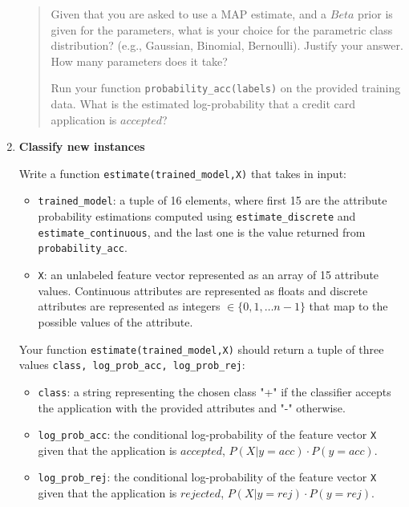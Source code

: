 \begin{enumerate}
    \begin{quote}
     Given that you are asked to use a MAP estimate, and a $Beta$ prior is given for the parameters, what is your choice for the  parametric class distribution? (e.g., Gaussian, Binomial, Bernoulli). Justify your answer. How many parameters does it take?
        
    \begin{tcolorbox}[fit,height=1.5cm, width=10cm, blank, borderline={1pt}{-2pt},nobeforeafter]
    \end{tcolorbox}\hspace{2cm}
        
     Run your function \texttt{probability\_acc(labels)} on the provided training data. What is the estimated log-probability that a credit card application is $accepted$? 
    
    \begin{tcolorbox}[fit,height=1.4cm, width=10cm, blank, borderline={1pt}{-2pt},nobeforeafter]
    \end{tcolorbox}\hspace{2cm}
    
    \end{quote}
    
    \pagebreak
    \item \textbf{Classify new instances} 
    
    Write a function \texttt{estimate(trained\_model,X)} that takes in input: 
    \begin{itemize}
        \item \texttt{trained\_model}: a tuple of 16 elements, where first 15 are the attribute probability estimations computed using \texttt{estimate\_discrete} and \texttt{estimate\_continuous}, and the last one is the value returned from \texttt{probability\_acc}. 
        \item {\tt X}: an unlabeled feature vector represented as an array of 15 attribute values. Continuous attributes are represented as floats and discrete attributes are represented as integers $\in \{0,1,\ldots n-1\}$ that map to the possible values of the attribute.
    \end{itemize}
    
    Your function \texttt{estimate(trained\_model,X)} should return a tuple of three values \texttt{class, log\_prob\_acc, log\_prob\_rej}:
    \begin{itemize}
        \item \texttt{class}: a string representing the chosen class "+" if the classifier accepts the application with the provided attributes and "-" otherwise. 
        \item \texttt{log\_prob\_acc}: the conditional log-probability of the feature vector {\tt X} given that the application is $accepted$, $P(X|y = acc) \cdot P(y = acc)$.
        \item \texttt{log\_prob\_rej}: the conditional log-probability of the feature vector {\tt X} given that the application is $rejected$, $P(X|y = rej) \cdot P(y = rej)$.
    \end{itemize}
    

\end{enumerate}
